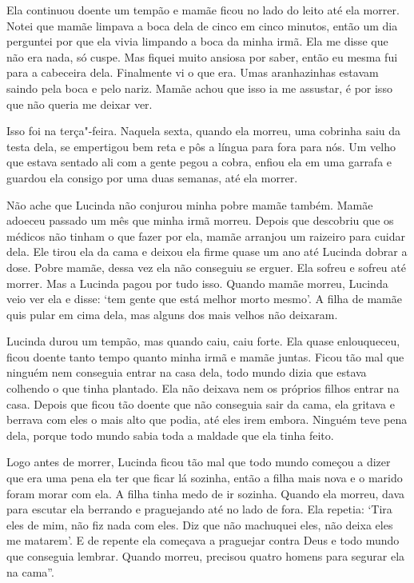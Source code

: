 Ela continuou doente um tempão e mamãe ficou no lado do leito até ela
morrer. Notei que mamãe limpava a boca dela de cinco em cinco minutos,
então um dia perguntei por que ela vivia limpando a boca da minha irmã.
Ela me disse que não era nada, só cuspe. Mas fiquei muito ansiosa por
saber, então eu mesma fui para a cabeceira dela. Finalmente vi o que
era. Umas aranhazinhas estavam saindo pela boca e pelo nariz. Mamãe
achou que isso ia me assustar, é por isso que não queria me deixar ver.

Isso foi na terça"-feira. Naquela sexta, quando ela morreu, uma cobrinha
saiu da testa dela, se empertigou bem reta e pôs a língua para fora para
nós. Um velho que estava sentado ali com a gente pegou a cobra, enfiou
ela em uma garrafa e guardou ela consigo por uma duas semanas, até ela
morrer.

Não ache que Lucinda não conjurou minha pobre mamãe também. Mamãe
adoeceu passado um mês que minha irmã morreu. Depois que descobriu que
os médicos não tinham o que fazer por ela, mamãe arranjou um raizeiro
para cuidar dela. Ele tirou ela da cama e deixou ela firme quase um ano
até Lucinda dobrar a dose. Pobre mamãe, dessa vez ela não conseguiu se
erguer. Ela sofreu e sofreu até morrer. Mas a Lucinda pagou por tudo
isso. Quando mamãe morreu, Lucinda veio ver ela e disse: `tem gente que
está melhor morto mesmo'. A filha de mamãe quis pular em cima dela, mas
alguns dos mais velhos não deixaram.

Lucinda durou um tempão, mas quando caiu, caiu forte. Ela quase
enlouqueceu, ficou doente tanto tempo quanto minha irmã e mamãe juntas.
Ficou tão mal que ninguém nem conseguia entrar na casa dela, todo mundo
dizia que estava colhendo o que tinha plantado. Ela não deixava nem os
próprios filhos entrar na casa. Depois que ficou tão doente que não
conseguia sair da cama, ela gritava e berrava com eles o mais alto que
podia, até eles irem embora. Ninguém teve pena dela, porque todo mundo
sabia toda a maldade que ela tinha feito.

Logo antes de morrer, Lucinda ficou tão mal que todo mundo começou a
dizer que era uma pena ela ter que ficar lá sozinha, então a filha mais
nova e o marido foram morar com ela. A filha tinha medo de ir sozinha.
Quando ela morreu, dava para escutar ela berrando e praguejando até no
lado de fora. Ela repetia: `Tira eles de mim, não fiz nada com eles. Diz
que não machuquei eles, não deixa eles me matarem'. E de repente ela
começava a praguejar contra Deus e todo mundo que conseguia lembrar.
Quando morreu, precisou quatro homens para segurar ela na cama''.

